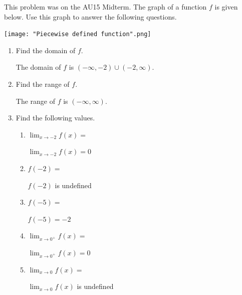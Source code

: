 \documentclass[nooutcomes,handout]{ximera}
\begin{document}
\begin{problem} This problem was on the AU15 Midterm. \hfil
	 The graph of a function $f$ is given below.  Use this graph to answer the following questions.
  \begin{image}
    \texttt{[image: "Piecewise defined function".png]}
  \end{image}

 \begin{enumerate}
    \item
        Find the domain of $f$.
        \begin{freeResponse}
          The domain of $f$ is $(-\infty, -2) \cup (-2, \infty)$.
        \end{freeResponse}


    \item
        Find the range of $f$.
        \begin{freeResponse}
          The range of $f$ is $(-\infty, \infty)$.
        \end{freeResponse}

    \item
      Find the following values.
      \begin{enumerate}
        \item
          $\displaystyle \lim_{x \to -2} f(x) = $
          \begin{freeResponse}
            $\displaystyle \lim_{x \to -2} f(x) = 0$
          \end{freeResponse}

        \item
          $f(-2) = $
          \begin{freeResponse}
            $f(-2)$ is undefined
          \end{freeResponse}


        \item
          $f(-5) = $
          \begin{freeResponse}
            $f(-5) = -2$
          \end{freeResponse}

        \item
          $\displaystyle \lim_{x \to 0^+} f(x) = $
          \begin{freeResponse}
            $\displaystyle \lim_{x \to 0^+} f(x) = 0$
          \end{freeResponse}

        \item
          $\displaystyle \lim_{x \to 0} f(x) = $
          \begin{freeResponse}
            $\displaystyle \lim_{x \to 0} f(x)$ is undefined
          \end{freeResponse}
      \end{enumerate}
  \end{enumerate}

\end{problem}
\end{document}
